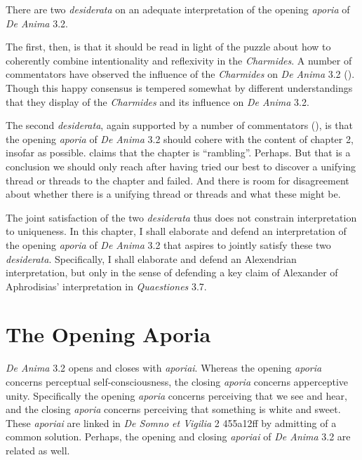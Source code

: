 There are two \emph{desiderata} on an adequate interpretation of the opening \emph{aporia} of \emph{De Anima} 3.2. 

The first, then, is that it should be read in light of the puzzle about how to coherently combine intentionality and reflexivity in the \emph{Charmides}. A number of commentators have observed the influence of the \emph{Charmides} on \emph{De Anima} 3.2 (). Though this happy consensus is tempered somewhat by different understandings that they display of the \emph{Charmides} and its influence on \emph{De Anima} 3.2. 

The second \emph{desiderata}, again supported by a number of commentators (), is that the opening \emph{aporia} of \emph{De Anima} 3.2 should cohere with the content of chapter 2, insofar as possible. \citet[121]{Hamlyn:2002ys} claims that the chapter is ``rambling''. Perhaps. But that is a conclusion we should only reach after having tried our best to discover a unifying thread or threads to the chapter and failed. And there is room for disagreement about whether there is a unifying thread or threads and what these might be.

The joint satisfaction of the two \emph{desiderata} thus does not constrain interpretation to uniqueness. In this chapter, I shall elaborate and defend an interpretation of the opening \emph{aporia} of \emph{De Anima} 3.2 that aspires to jointly satisfy these two \emph{desiderata}. Specifically, I shall elaborate and defend an Alexendrian interpretation, but only in the sense of defending a key claim of Alexander of Aphrodisias' interpretation in \emph{Quaestiones} 3.7.


\section{The Opening Aporia} %
\label{sec:the_opening_aporia}

\emph{De Anima} 3.2 opens and closes with \emph{aporiai}. Whereas the opening \emph{aporia} concerns perceptual self-consciousness, the closing \emph{aporia} concerns apperceptive unity. Spe\-cifically the opening \emph{aporia} concerns perceiving that we see and hear, and the closing \emph{aporia} concerns perceiving that something is white and sweet. These \emph{aporiai} are linked in \emph{De Somno et Vigilia} 2 455a12ff by admitting of a common solution. Perhaps, the opening and closing \emph{aporiai} of \emph{De Anima} 3.2 are related as well.

